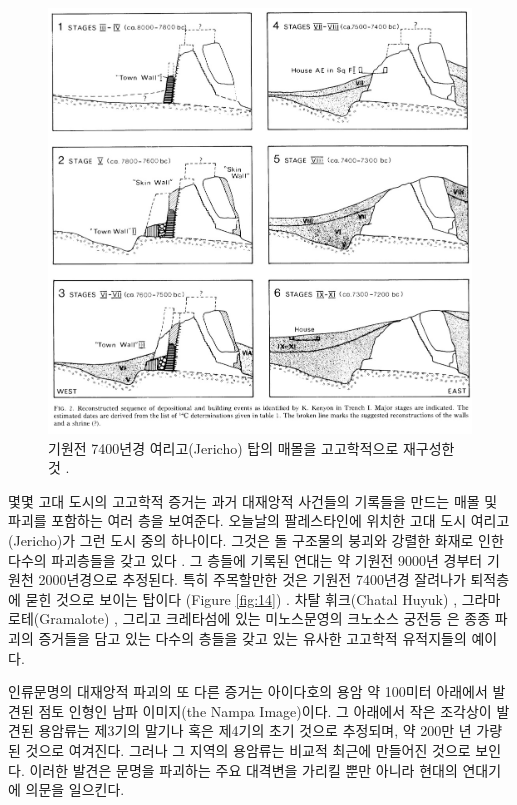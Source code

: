 \documentclass[10pt,twocolumn,letterpaper]{article}
\begin{document}
\begin{figure}[t]
\begin{center}
   \includegraphics[width=1\linewidth]{jericho.jpg}
\end{center}
   \caption{기원전 7400년경 여리고(Jericho) 탑의 매몰을 고고학적으로 재구성한 것 \cite{95}.}
\label{fig:14}
\label{fig:onecol}
\end{figure}

몇몇 고대 도시의 고고학적 증거는 과거 대재앙적 사건들의 기록들을 만드는 매몰 및 파괴를 포함하는 여러 층을 보여준다. 오늘날의  팔레스타인에 위치한 고대 도시 여리고(Jericho)가 그런 도시 중의 하나이다. 그것은 돌 구조물의 붕괴와 강렬한 화재로 인한 다수의 파괴층들을 갖고 있다 \cite{96,97}. 그 층들에 기록된 연대는 약 기원전 9000년 경부터 기원천 2000년경으로 추정된다. 특히 주목할만한 것은 기원전 7400년경 잘려나가 퇴적층에 묻힌 것으로 보이는 탑이다 (Figure \ref{fig:14}) \cite{95}. 차탈 휘크(Chatal Huyuk) \cite{99}, 그라마로테(Gramalote) \cite{98}, 그리고 크레타섬에 있는 미노스문영의 크노소스 궁전등 \cite{100,101}은 종종 파괴의 증거들을 담고 있는 다수의 층들을 갖고 있는 유사한 고고학적 유적지들의 예이다. 

인류문명의 대재앙적 파괴의 또 다른 증거는 아이다호의 용암 약 100미터 아래에서 발견된 점토 인형인 남파 이미지(the Nampa Image)이다\cite{102,103}. 그 아래에서 작은 조각상이 발견된 용암류는 제3기의 말기나 혹은 제4기의 초기 것으로 추정되며, 약 200만 년 가량 된 것으로 여겨진다. 그러나 그 지역의 용암류는 비교적 최근에 만들어진 것으로 보인다. 이러한 발견은 문명을 파괴하는 주요 대격변을 가리킬 뿐만 아니라 현대의 연대기에 의문을 일으킨다.
\end{document}
